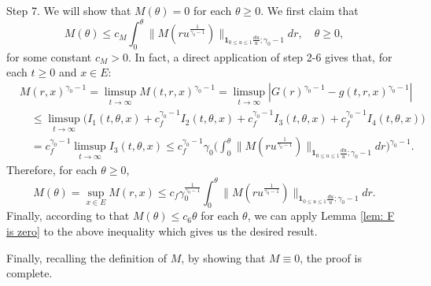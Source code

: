 \documentclass[12pt, a4paper]{amsart}
\theoremstyle{definition}
\numberwithin{equation}{section}
\begin{document}
	Step 7. We will show that $M(\theta) = 0$ for each $\theta \geq 0$.
	We first claim that
\[
	M(\theta) 
	\leq c_M\int_0^\theta  \big\| M(r u^{\frac{1}{\gamma_0 - 1}}) \big\|_{\mathbf 1_{0\leq u\leq 1}\frac{du}{u};\gamma_0 - 1}  dr ,
	\quad \theta \geq 0,
\]
	for some constant $c_M > 0$.
	In fact, a direct application of step 2-6 gives that, for each $t\geq 0$ and $x\in E$:
\[\begin{split}
	&M(r,x)^{\gamma_0 - 1}
	=\limsup_{t\to \infty} M(t,r,x)^{\gamma_0 - 1} 
	= \limsup_{t\to \infty}|G(r)^{\gamma_0 - 1} - g(t,r,x)^{\gamma_0 - 1}|
	\\&\quad \leq \limsup_{t\to \infty} \big( I_1(t,\theta,x) +c^{\gamma_0 - 1}_f I_2(t,\theta,x) +c^{\gamma_0 - 1}_f I_3(t,\theta,x) + c^{\gamma_0 - 1}_f I_4(t,\theta,x) \big)
	\\& \quad = c_f^{\gamma_0 - 1} \limsup_{t\to \infty} I_3(t,\theta ,x)
	\leq c_f^{\gamma_0 - 1} \gamma_0 \Big(  \int_0^\theta  \big\| M(r u^{\frac{1}{\gamma_0 - 1}}) \big\|_{\mathbf 1_{0\leq u\leq 1}\frac{du}{u};\gamma_0 - 1}  dr\Big)^{\gamma_0 - 1}.
\end{split}\]
	Therefore, for each $\theta \geq 0$,
\[
	M(\theta) 
	= \sup_{x\in E}  M(r,x)
	\leq c_f \gamma_0^{\frac{1}{\gamma_0 - 1}} \int_0^\theta  \big\| M(r u^{\frac{1}{\gamma_0 - 1}}) \big\|_{\mathbf 1_{0\leq u\leq 1}\frac{du}{u};\gamma_0 - 1}  dr.
\]
	Finally, according to that $M(\theta) \leq c_6 \theta$ for each $\theta$, we can apply Lemma \ref{lem: F is zero} to the above inequality which gives us the desired result.
	
	Finally, recalling the definition of $M$, by showing that $M\equiv 0$, the proof is complete.
\end{document}

